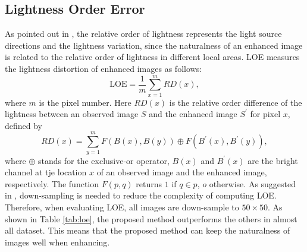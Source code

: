 \subsection{Lightness Order Error}
As pointed out in \cite{loe}, the relative order of lightness represents the light source directions and the lightness variation, since the naturalness of an enhanced image is related to the relative order of lightness in different local areas. LOE measures the lightness distortion of enhanced images as follows:
\begin{equation}
\mbox{LOE} = \frac{1}{m} \sum_{x=1}^{m}{RD(x)}, \label{eq:loe}
\end{equation}
where $m$ is the pixel number. Here $RD(x)$ is the relative order difference of the lightness between an observed image $S$ and the enhanced image $S^{'}$ for pixel $x$, defined by
\begin{equation}
RD(x) = \sum_{y=1}^{m}F(B(x), B(y)) \oplus F(B^{'}(x), B^{'}(y)), \label{eq:rd}
\end{equation}
where $\oplus$ stands for the exclusive-or operator, $B(x)$ and $B^{'}(x)$ are the bright channel at tje location $x$ of an observed image and the enhanced image, respectively. The function $F(p, q)$ returns $1$ if $q \in p$, $o$ otherwise. As suggested in \cite{lime}, down-sampling is needed to reduce the complexity of computing LOE. Therefore, when evaluating LOE, all images are down-sample to $50 \times 50$. As shown in Table \ref{tab:loe}, the proposed method outperforms the others in almost all dataset. This means that the proposed method can keep the naturalness of images well when enhancing.

